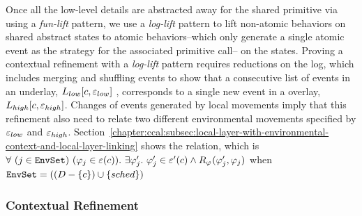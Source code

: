 Once all the low-level details are abstracted away for the shared primitive via using a \textit{fun-lift} pattern, we use a \textit{log-lift} pattern to lift non-atomic behaviors on shared abstract states to atomic behaviors--which only generate a single atomic event as the strategy for the associated primitive call-- on the states. 
Proving a contextual refinement with a \textit{log-lift} pattern requires reductions on the log, 
which includes merging and shuffling events to show 
that a consecutive list of  events in an underlay, $L_{low}[c, {\varepsilon}_{low}]$ , corresponds to a single new event in a overlay, 
$L_{high}[c, {\varepsilon}_{high}]$.  Changes of events generated by local movements
imply that this refinement also need to relate two different environmental movements specified by ${\varepsilon}_{low}$ and ${\varepsilon}_{high}$.
Section~\ref{chapter:ccal:subsec:local-layer-with-environmental-context-and-local-layer-linking} shows the relation,
which is $\forall\ (j \in \codeinmath{EnvSet})\ 
(\strat{j} \in \oracle(c)) .\ \exists \stratp{j} . \ \stratp{j} \in \oracle'(c) \wedge R_{\strat{}}(\stratp{j}, \strat{j})$ when 
${\mathrm{\texttt{EnvSet}}} = ((D - \{ c\}) \cup \{ sched\})$


\subsubsection{Contextual Refinement}

